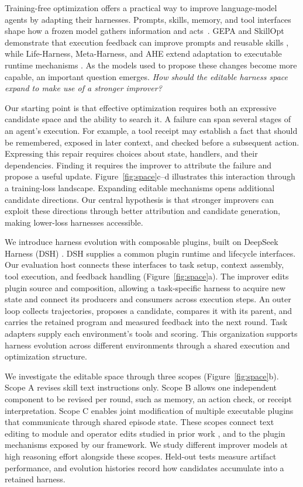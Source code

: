 \documentclass[letterpaper]{article}
\begin{document}
Training-free optimization offers a practical way to improve language-model agents by adapting their harnesses. Prompts, skills, memory, and tool interfaces shape how a frozen model gathers information and acts~\citep{react,sweagent,codeact}. GEPA and SkillOpt demonstrate that execution feedback can improve prompts and reusable skills \citep{gepa,skillopt}, while Life-Harness, Meta-Harness, and AHE extend adaptation to executable runtime mechanisms \citep{life,meta,ahe}. As the models used to propose these changes become more capable, an important question emerges. \emph{How should the editable harness space expand to make use of a stronger improver?}

Our starting point is that effective optimization requires both an expressive candidate space and the ability to search it. A failure can span several stages of an agent's execution. For example, a tool receipt may establish a fact that should be remembered, exposed in later context, and checked before a subsequent action. Expressing this repair requires choices about state, handlers, and their dependencies. Finding it requires the improver to attribute the failure and propose a useful update. Figure~\ref{fig:space}c--d illustrates this interaction through a training-loss landscape. Expanding editable mechanisms opens additional candidate directions. Our central hypothesis is that stronger improvers can exploit these directions through better attribution and candidate generation, making lower-loss harnesses accessible.

We introduce harness evolution with composable plugins, built on DeepSeek Harness (DSH) \citep{deepseek-harness}. DSH supplies a common plugin runtime and lifecycle interfaces. Our evaluation host connects these interfaces to task setup, context assembly, tool execution, and feedback handling (Figure~\ref{fig:space}a). The improver edits plugin source and composition, allowing a task-specific harness to acquire new state and connect its producers and consumers across execution steps. An outer loop collects trajectories, proposes a candidate, compares it with its parent, and carries the retained program and measured feedback into the next round. Task adapters supply each environment's tools and scoring. This organization supports harness evolution across different environments through a shared execution and optimization structure.

We investigate the editable space through three scopes (Figure~\ref{fig:space}b). Scope A revises skill text instructions only. Scope B allows one independent component to be revised per round, such as memory, an action check, or receipt interpretation. Scope C enables joint modification of multiple executable plugins that communicate through shared episode state. These scopes connect text editing to module and operator edits studied in prior work \citep{agentsquare,aflow}, and to the plugin mechanisms exposed by our framework. We study different improver models at high reasoning effort alongside these scopes. Held-out tests measure artifact performance, and evolution histories record how candidates accumulate into a retained harness.
\end{document}
